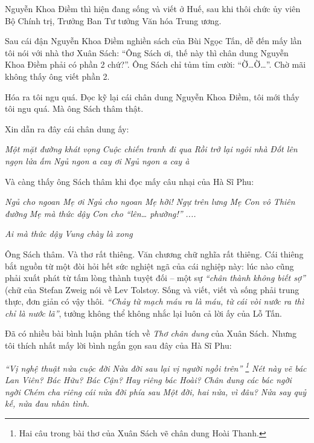 \documentclass[../main.tex]{subfiles}
\begin{document}
\begin{multicols}{2}
Nguyễn Khoa Điềm thì hiện đang sống và viết ở Huế, sau khi thôi chức ủy viên Bộ Chính trị, Trưởng Ban Tư tưởng Văn hóa Trung ương. 
 
Sau cái đận Nguyễn Khoa Điềm nghiền sách của Bùi Ngọc Tấn, dễ đến mấy lần tôi nói với nhà thơ Xuân Sách: “Ông Sách ơi, thế này thì chân dung Nguyễn Khoa Điềm phải có phần 2 chứ?”. Ông Sách chỉ tủm tỉm cười: “Ờ…Ờ…”. Chờ mãi không thấy ông viết phần 2. 
 
Hóa ra tôi ngu quá. Đọc kỹ lại cái chân dung Nguyễn Khoa Điềm, tôi mới thấy tôi ngu quá. Mà ông Sách thâm thật. 
 
Xin dẫn ra đây cái chân dung ấy: 
\begin{blockquote}
        
\textit{Một mặt đường khát vọng}        
\textit{Cuộc chiến tranh đi qua}        
\textit{Rồi trở lại ngôi nhà}        
\textit{Đốt lên ngọn lửa ấm}       
\textit{Ngủ ngon a cay ơi} 
\textit{Ngủ ngon a cay à} 

\end{blockquote}
 
Và càng thấy ông Sách thâm khi đọc mấy câu nhại của Hà Sĩ Phu: 
\begin{blockquote}
        
\textit{Ngủ cho ngoan Mẹ ơi }        
\textit{Ngủ cho ngoan Mẹ hỡi!}        
\textit{Ngự trên lưng Mẹ}        
\textit{Con vô Thiên đường}        
\textit{Mẹ mà thức dậy}        
\textit{Con cho “lên… phường!”}        
\textit{....}        
        
\textit{Ai mà thức dậy} 
\textit{Vung chày là xong} 

\end{blockquote}
 
Ông Sách thâm. Và thơ rất thiêng. Văn chương chữ nghĩa rất thiêng. Cái thiêng bắt nguồn từ một đòi hỏi hết sức nghiệt ngã của cái nghiệp này: lúc nào cũng phải xuất phát từ tấm lòng thành tuyệt đối – một sự \textit{“chân thành không biết sợ”} (chữ của Stefan Zweig nói về Lev Tolstoy. Sống và viết, viết và sống phải trung thực, đơn giản có vậy thôi. \textit{“Chảy từ mạch máu ra là máu, từ cái vòi nước ra thì chỉ là nước lã”}, tưởng không thể không nhắc lại luôn cả lời ấy của Lỗ Tấn. 
 
Đã có nhiều bài bình luận phân tích về \textit{Thơ chân dung} của Xuân Sách. Nhưng tôi thích nhất mấy lời bình ngắn gọn sau đây của Hà Sĩ Phu: 
\begin{blockquote}
        
\textit{“Vị nghệ thuật nửa cuộc đời}        
\textit{Nửa đời sau lại vị người ngồi trên” \footnote{
Hai câu trong bài thơ của Xuân Sách vẽ chân dung Hoài Thanh.} }        
\textit{Nét này vẽ bác Lan Viên?}       
\textit{Bác Hữu?}        
\textit{Bác Cận?}        
\textit{Hay riêng bác Hoài?}        
\textit{Chân dung các bác ngời ngời}        
\textit{Chém cha riêng cái nửa đời phía sau}        
\textit{Một đời, hai nửa, vì đâu?} 
\textit{Nửa say quỷ kế, nửa đau nhân tình.} 


\end{blockquote}
\end{multicols}
\end{document}
